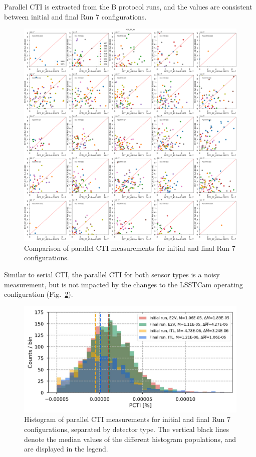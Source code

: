 Parallel CTI is extracted from the B protocol runs, and the values are consistent between initial and final Run 7 configurations. 

\begin{figure}[ht]
    \centering
    \includegraphics[width=0.7\linewidth]{figures/finalCharacterization/E1071_E1880_PCTI_EF_43_inset.png}
    \caption{Comparison of parallel CTI measurements for initial and final Run 7 configurations.}
    \label{fig:finalChar-PCTI-5x5}
\end{figure}

Similar to serial CTI, the parallel CTI for both sensor types is a noisy measurement, but is not impacted by the changes to the LSSTCam operating configuration (Fig.~\ref{fig:finalChar-PCTI-hist}). 

\begin{figure}[ht]
    \centering
    \includegraphics[width=0.7\linewidth]{figures/finalCharacterization/PCTIComp(3).jpg}
    \caption{Histogram of parallel CTI measurements for initial and final Run 7 configurations, separated by detector type. The vertical black lines denote the median values of the different histogram populations, and are displayed in the legend.}
    \label{fig:finalChar-PCTI-hist}
\end{figure}

